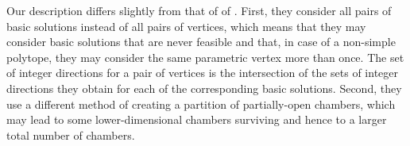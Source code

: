 Our description differs slightly from that of
of .
First, they consider all pairs of basic solutions instead
of all pairs of vertices, which means that they may
consider basic solutions that are never feasible and that,
in case of a non-simple polytope,
they may consider the same parametric vertex more than once.
The set of integer
directions for a pair of vertices is the intersection of
the sets of integer directions they obtain for each of
the corresponding basic solutions.
Second, they use a different method of creating a partition
of partially-open chambers, which may lead to some lower-dimensional
chambers surviving and hence to a larger total number of chambers.
